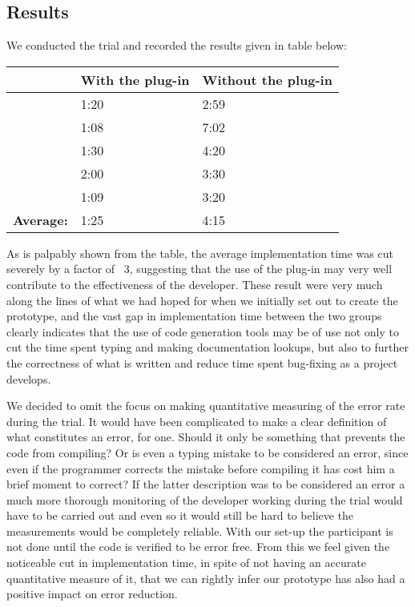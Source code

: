 \subsection{Results}
\label{Results}
We conducted the trial and recorded the results given in table below:

\begin{center}
\begin{tabular}{|l|l|l|}
    \hline
    ~        & {\bf With the plug-in} & {\bf Without the plug-in} \\ \hline
    ~        & 1:20             & 2:59                \\ \hline
    ~        & 1:08             & 7:02                \\ \hline
    ~        & 1:30             & 4:20                \\ \hline
    ~        & 2:00             & 3:30                \\ \hline
    ~        & 1:09             & 3:20                   \\ \hline
    {\bf Average:} & 1:25             & 4:15                \\ \hline
\end{tabular}
\end{center}

As is palpably shown from the table, the average implementation time was cut severely by a factor of ~3, suggesting that the use of the plug-in may very well contribute to the effectiveness of the developer. These result were very much along the lines of what we had hoped for when we initially set out to create the prototype, and the vast gap in implementation time between the two groups clearly indicates that the use of code generation tools may be of use not only to cut the time spent typing and making documentation lookups, but also to further the correctness of what is written and reduce time spent bug-fixing as a project develops.

We decided to omit the focus on making quantitative measuring of the error rate during the trial. It would have been complicated to make a clear definition of what constitutes an error, for one. Should it only be something that prevents the code from compiling? Or is even a typing mistake to be considered an error, since even if the programmer corrects the mistake before compiling it has cost him a brief moment to correct? If the latter description was to be considered an error a much more thorough monitoring of the developer working during the trial would have to be carried out and even so it would still be hard to believe the measurements would be completely reliable.
With our set-up the participant is not done until the code is verified to be error free. From this we feel given the noticeable cut in implementation time, in spite of not having an accurate quantitative measure of it, that we can rightly infer our prototype has also had a positive impact on error reduction.  








